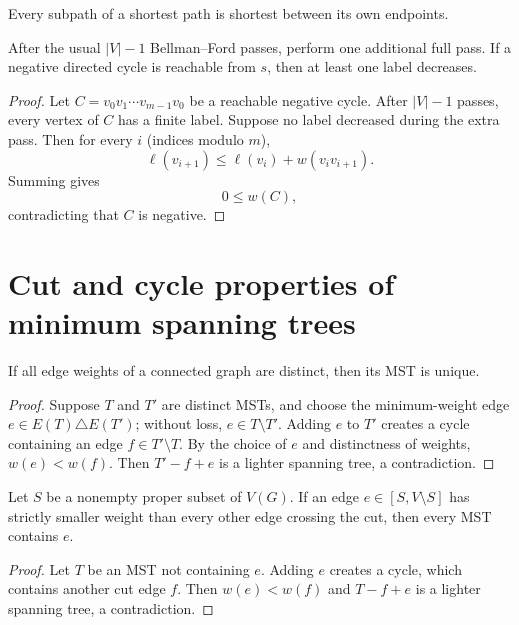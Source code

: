 \begin{notecorollary}
Every subpath of a shortest path is shortest between its own endpoints.
\end{notecorollary}
\begin{notetheorem}
After the usual $|V|-1$ Bellman--Ford passes, perform one additional full pass.  If a negative directed cycle is reachable from $s$, then at least one label decreases.
\end{notetheorem}
\begin{proof}
Let $C=v_0v_1\cdots v_{m-1}v_0$ be a reachable negative cycle.  After $|V|-1$ passes, every vertex of $C$ has a finite label.  Suppose no label decreased during the extra pass.  Then for every $i$ (indices modulo $m$),
\[
  \ell(v_{i+1})\le\ell(v_i)+w(v_iv_{i+1}).
\]
Summing gives
\[
  0\le w(C),
\]
contradicting that $C$ is negative.
\end{proof}
\section{Cut and cycle properties of minimum spanning trees}

\begin{notetheorem}
If all edge weights of a connected graph are distinct, then its MST is unique.
\end{notetheorem}
\begin{proof}
Suppose $T$ and $T'$ are distinct MSTs, and choose the minimum-weight edge $e\in E(T)\triangle E(T')$; without loss, $e\in T\setminus T'$.  Adding $e$ to $T'$ creates a cycle containing an edge $f\in T'\setminus T$.  By the choice of $e$ and distinctness of weights, $w(e)<w(f)$.  Then $T'-f+e$ is a lighter spanning tree, a contradiction.
\end{proof}

\begin{notetheorem}
Let $S$ be a nonempty proper subset of $V(G)$.  If an edge $e\in[S,V\setminus S]$ has strictly smaller weight than every other edge crossing the cut, then every MST contains $e$.
\end{notetheorem}
\begin{proof}
Let $T$ be an MST not containing $e$.  Adding $e$ creates a cycle, which contains another cut edge $f$.  Then $w(e)<w(f)$ and $T-f+e$ is a lighter spanning tree, a contradiction.
\end{proof}

